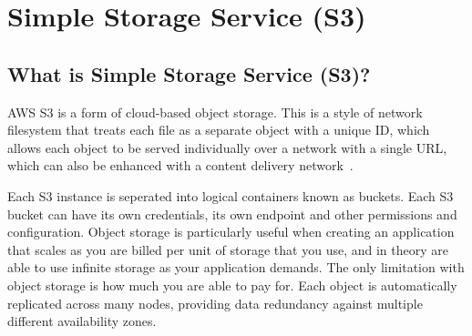 \chapter{Simple Storage Service (S3)}\label{ch:simple-storage-service}

\section{What is Simple Storage Service (S3)?}
AWS S3 is a form of cloud-based object storage.
This is a style of network filesystem that treats each file as a separate object with a unique ID, which allows each
object to be served individually over a network with a single URL, which can also be enhanced with a content delivery
network~\parencite{amazon2022cloud}.

Each S3 instance is seperated into logical containers known as buckets.
Each S3 bucket can have its own credentials, its own endpoint and other permissions and configuration.
Object storage is particularly useful when creating an application that scales as you are billed per unit of storage
that you use, and in theory are able to use infinite storage as your application demands.
The only limitation with object storage is how much you are able to pay for.
Each object is automatically replicated across many nodes, providing data redundancy against multiple different
availability zones.


